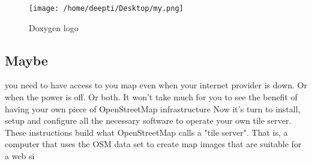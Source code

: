 
\begin{figure}[!ht]
\centering \texttt{[image: /home/deepti/Desktop/my.png]}
\caption{Doxygen logo}
\end{figure}
\subsection*{Maybe}
 you need to have access to you map even when your internet provider is down. Or when the power is off. Or both. It won’t take much for you to see the benefit of having your own piece of OpenStreetMap infrastructure
Now it’s turn to install, setup and configure all the necessary software to operate your own tile server.
These instructions build what OpenStreetMap calls a "tile server". That is, a computer that uses the OSM data set to create map images that are suitable for a web si
